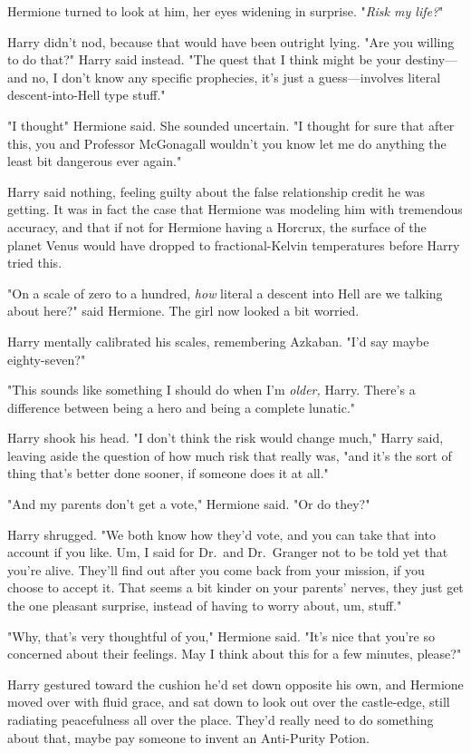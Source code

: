 Hermione turned to look at him, her eyes widening in surprise. "\emph{Risk my
life?}"

Harry didn't nod, because that would have been outright lying. "Are you willing
to do that?" Harry said instead. "The quest that I think might be your
destiny—and no, I don't know any specific prophecies, it's just a
guess—involves literal descent-into-Hell type stuff."

"I thought{\el}" Hermione said. She sounded uncertain. "I thought for sure
that after this, you and Professor McGonagall wouldn't{\el} you know{\el}
let me do anything the least bit dangerous ever again."

Harry said nothing, feeling guilty about the false relationship credit he was
getting. It was in fact the case that Hermione was modeling him with tremendous
accuracy, and that if not for Hermione having a Horcrux, the surface of the
planet Venus would have dropped to fractional-Kelvin temperatures before Harry
tried this.

"On a scale of zero to a hundred, \emph{how} literal a descent into Hell are we
talking about here?" said Hermione. The girl now looked a bit worried.

Harry mentally calibrated his scales, remembering Azkaban. "I'd say maybe
eighty-seven?"

"This sounds like something I should do when I'm \emph{older,} Harry. There's a
difference between being a hero and being a complete lunatic."

Harry shook his head. "I don't think the risk would change much," Harry said,
leaving aside the question of how much risk that really was, "and it's the sort
of thing that's better done sooner, if someone does it at all."

"And my parents don't get a vote," Hermione said. "Or do they?"

Harry shrugged. "We both know how they'd vote, and you can take that into
account if you like. Um, I said for Dr.~and Dr.~Granger not to be told yet that
you're alive. They'll find out after you come back from your mission, if you
choose to accept it. That seems a bit{\el} kinder on your parents' nerves,
they just get the one pleasant surprise, instead of having to worry about, um,
stuff."

"Why, that's very thoughtful of you," Hermione said. "It's nice that you're so
concerned about their feelings. May I think about this for a few minutes,
please?"

Harry gestured toward the cushion he'd set down opposite his own, and Hermione
moved over with fluid grace, and sat down to look out over the castle-edge,
still radiating peacefulness all over the place. They'd really need to do
something about that, maybe pay someone to invent an Anti-Purity Potion.

